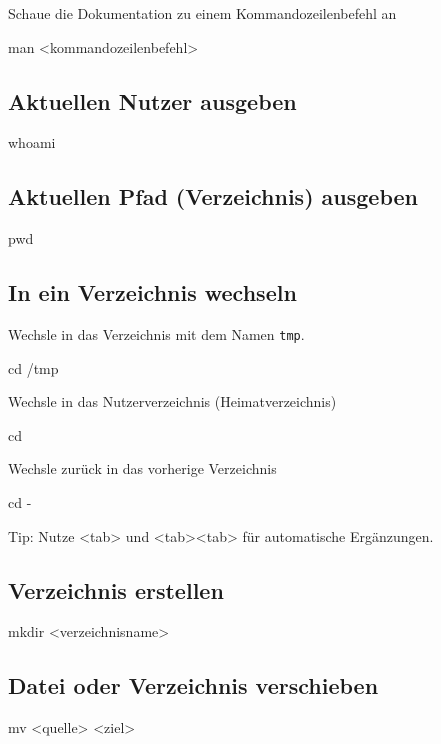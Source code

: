 \documentclass[]{article}
\newcommand{\code}[1]{\texttt{#1}}
\begin{document}
Schaue die Dokumentation zu einem Kommandozeilenbefehl an
\begin{bashcode}
man <kommandozeilenbefehl>
\end{bashcode}

\subsection{Aktuellen Nutzer ausgeben}
\begin{bashcode}
whoami
\end{bashcode}

\subsection{Aktuellen Pfad (Verzeichnis) ausgeben}
\begin{bashcode}
pwd
\end{bashcode}

\subsection{In ein Verzeichnis wechseln}
Wechsle in das Verzeichnis mit dem Namen \code{tmp}.
\begin{bashcode}
cd /tmp
\end{bashcode}

Wechsle in das Nutzerverzeichnis (Heimatverzeichnis)
\begin{bashcode}
cd ~
\end{bashcode}

Wechsle zurück in das vorherige Verzeichnis
\begin{bashcode}
cd -
\end{bashcode}

Tip: Nutze <tab> und <tab><tab> für automatische Ergänzungen.

\subsection{Verzeichnis erstellen}
\begin{bashcode}
mkdir <verzeichnisname>
\end{bashcode}

\subsection{Datei oder Verzeichnis verschieben}
\begin{bashcode}
mv <quelle> <ziel>
\end{bashcode}
\end{document}
